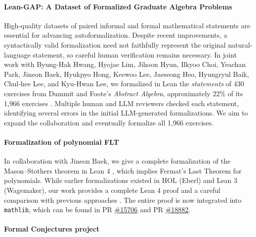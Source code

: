 \documentclass[letterpaper, 10pt]{article}
\begin{document}
\paragraph{Lean-GAP: A Dataset of Formalized Graduate Algebra Problems}

High-quality datasets of paired informal and formal mathematical statements are essential for advancing autoformalization. Despite recent improvements, a syntactically valid formalization need not faithfully represent the original natural-language statement, so careful human verification remains necessary. In joint work with Byung-Hak Hwang, Hyojae Lim, Jihoon Hyun, Ilkyoo Choi, Yeachan Park, Jineon Baek, Hyukpyo Hong, Keewoo Lee, Jaeseong Heo, Hyungryul Baik, Chul-hee Lee, and Kyu-Hwan Lee, we formalized in Lean the \emph{statements} of 430 exercises from Dummit and Foote's \emph{Abstract Algebra}, approximately 22\% of its 1,966 exercises \cite{lee2026lean}.
Multiple human and LLM reviewers checked each statement, identifying several errors in the initial LLM-generated formalizations. We aim to expand the collaboration and eventually formalize all 1,966 exercises.


\paragraph{Formalization of polynomial FLT}

In collaboration with Jineon Baek, we give a complete formalization of the Mason--Stothers theorem in Lean 4 \cite{baek2024formalizing}, which implies Fermat's Last Theorem for polynomials.
While earlier formalizations existed in HOL (Eberl) and Lean 3 (Wagemaker), our work provides a complete Lean 4 proof and a careful comparison with previous approaches \cite[Section 7]{baek2024formalizing}.
The entire proof is now integrated into \texttt{mathlib}, which can be found in PR \href{https://github.com/leanprover-community/mathlib4/pull/15706}{\#15706} and PR  \href{https://github.com/leanprover-community/mathlib4/pull/18882}{\#18882}.

\paragraph{Formal Conjectures project}
\end{document}
